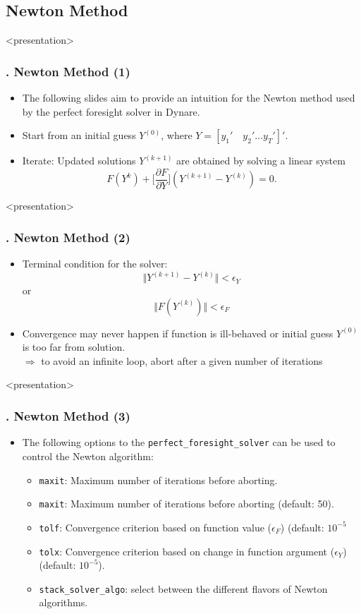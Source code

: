 \documentclass[11pt,aspectratio=169]{beamer}
\begin{document}
\subsection{Newton Method}
\begin{frame}<presentation>
	\frametitle{{\thesection.\thesubsection} Newton Method (1)}
	\begin{itemize}
		\item The following slides aim to provide an intuition for the Newton method used by the perfect foresight solver in Dynare.
		\item Start from an initial guess $Y^{(0)}$, where $Y=[y_1' \quad y_2' \ldots y_T']'$.
		\item Iterate: Updated solutions $Y^{(k+1)}$ are obtained by solving a linear system 
		$$F(Y^{k}) + \bigg[\frac{\partial F}{\partial Y}\bigg] (Y^{(k+1)} - Y^{(k)}) = 0.$$
	\end{itemize}
\end{frame}
\begin{frame}<presentation>
\frametitle{{\thesection.\thesubsection} Newton Method (2)}
\begin{itemize}
	\item Terminal condition for the solver:
	$$\Vert Y^{(k+1)} - Y^{(k)} \Vert < \epsilon_Y$$
	or
	$$\Vert F(Y^{(k)}) \Vert < \epsilon_F$$
	\item Convergence may never happen if function is ill-behaved or initial guess $Y^{(0)}$ is too far from solution.\\
	$\Rightarrow$ to avoid an infinite loop, abort after a given number of iterations
\end{itemize}
\end{frame}
\begin{frame}<presentation>
	\frametitle{{\thesection.\thesubsection} Newton Method (3)}
	\begin{itemize}
		\item The following options to the \texttt{perfect\_foresight\_solver} can be used to control the Newton algorithm:\\
		\begin{itemize}
			\item \texttt{maxit}: Maximum number of iterations before aborting.
			\item \texttt{maxit}: Maximum number of iterations before aborting (default: 50).
			\item \texttt{tolf}: Convergence criterion based on function value ($\epsilon_F$) (default: $10^{-5}$ 
			\item \texttt{tolx}: Convergence criterion based on change in function argument ($\epsilon_Y$) (default: $10^{-5}$).
			\item \texttt{stack\_solver\_algo}: select between the different flavors of Newton algorithms.
		\end{itemize}
	\end{itemize}
\end{frame}
\end{document}
